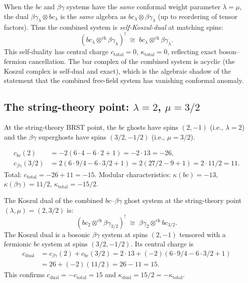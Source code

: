 \documentclass[11pt]{article}
\begin{document}
\begin{remark}[When $\lambda = \mu$: self-Koszul-dual tensor product]
\label{rem:self-dual-tensor}
When the $bc$ and $\beta\gamma$ systems have the \emph{same}
conformal weight parameter $\lambda = \mu$, the dual
$\beta\gamma_\lambda \otimes bc_\lambda$ is the \emph{same}
algebra as $bc_\lambda \otimes \beta\gamma_\lambda$ (up to
reordering of tensor factors).  Thus the combined system is
\emph{self-Koszul-dual} at matching spins:
\[
(bc_\lambda \otimes^{\mathrm{ch}} \beta\gamma_\lambda)^!
\;\cong\;
bc_\lambda \otimes^{\mathrm{ch}} \beta\gamma_\lambda.
\]
This self-duality has central charge $c_{\mathrm{total}} = 0$,
$\kappa_{\mathrm{total}} = 0$, reflecting exact boson--fermion
cancellation.  The bar complex of the combined system is
acyclic (the Koszul complex is self-dual and exact), which is
the algebraic shadow of the statement that the combined
free-field system has vanishing conformal anomaly.
\end{remark}


\subsection{The string-theory point: $\lambda = 2$, $\mu = 3/2$}

At the string-theory BRST point, the $bc$ ghosts have spins
$(2, -1)$ (i.e., $\lambda = 2$) and the $\beta\gamma$ superghosts
have spins $(3/2, -1/2)$ (i.e., $\mu = 3/2$).

\begin{proposition}
\label{comp:string-cc}
\begin{align*}
c_{bc}(2) &= -2(6 \cdot 4 - 6 \cdot 2 + 1) = -2 \cdot 13 = -26, \\
c_{\beta\gamma}(3/2) &= 2(6 \cdot 9/4 - 6 \cdot 3/2 + 1)
  = 2(27/2 - 9 + 1) = 2 \cdot 11/2 = 11.
\end{align*}
Total: $c_{\mathrm{total}} = -26 + 11 = -15$.  Modular characteristics:
$\kappa(bc) = -13$, $\kappa(\beta\gamma) = 11/2$,
$\kappa_{\mathrm{total}} = -15/2$.
\end{proposition}

\begin{theorem}
\label{thm:koszul-string-ghosts}
The Koszul dual of the combined $bc$--$\beta\gamma$ ghost system
at the string-theory point $(\lambda, \mu) = (2, 3/2)$ is:
\begin{equation}\label{eq:koszul-string-dual}
(bc_2 \otimes^{\mathrm{ch}} \beta\gamma_{3/2})^!
\;\cong\;
\beta\gamma_2 \otimes^{\mathrm{ch}} bc_{3/2}.
\end{equation}
The Koszul dual is a bosonic $\beta\gamma$ system at spins
$(2, -1)$ tensored with a fermionic $bc$ system at spins
$(3/2, -1/2)$.  Its central charge is
\begin{align*}
c_{\mathrm{dual}} &= c_{\beta\gamma}(2) + c_{bc}(3/2)
= 2 \cdot 13 + (-2)(6 \cdot 9/4 - 6 \cdot 3/2 + 1) \\
&= 26 + (-2)(11/2) = 26 - 11 = 15.
\end{align*}
This confirms $c_{\mathrm{dual}} = -c_{\mathrm{total}} = 15$
and $\kappa_{\mathrm{dual}} = 15/2 = -\kappa_{\mathrm{total}}$.
\end{theorem}
\end{document}

